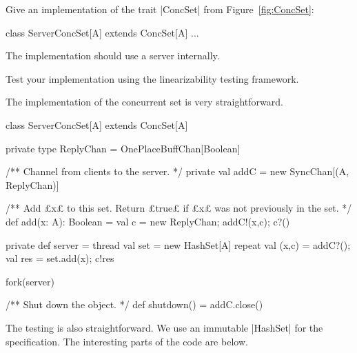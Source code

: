 \begin{questionS}
\label{ex:conc-set}
Give an implementation of the trait |ConcSet| from Figure~\ref{fig:ConcSet}:
\begin{scala}
class ServerConcSet[A] extends ConcSet[A]{ ... }
\end{scala}
The implementation should use a server internally.

Test your implementation using the linearizability testing framework.  
\end{questionS}


\begin{answerS}
The implementation of the concurrent set is very straightforward.
%
\begin{scala}
class ServerConcSet[A] extends ConcSet[A]{
  private type ReplyChan = OnePlaceBuffChan[Boolean]

  /** Channel from clients to the server. */
  private val addC = new SyncChan[(A, ReplyChan)]

  /** Add £x£ to this set.  Return £true£ if £x£ was not previously in the set. */
  def add(x: A): Boolean = {
    val c = new ReplyChan; addC!(x,c); c?()
  }

  private def server = thread{
    val set = new HashSet[A]
    repeat{ val (x,c) = addC?(); val res = set.add(x); c!res }
  }

  fork(server)

  /** Shut down the object. */
  def shutdown() = addC.close()
}
\end{scala}

The testing is also straightforward.  We use an immutable |HashSet| for the
specification.  The interesting parts of the code are below.
%
\end{answerS}

